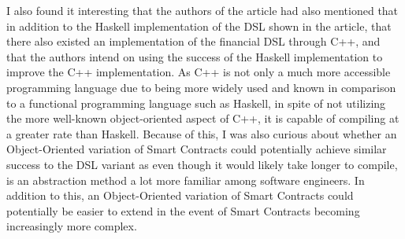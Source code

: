 \documentclass{article}
\theoremstyle{theorem}
\theoremstyle{definition}
\theoremstyle{remark}
\begin{document}
\indent I also found it interesting that the authors of the article had also mentioned that in addition to the Haskell implementation of the DSL shown in the article, that there also existed an implementation of the financial DSL through C++, and that the authors intend on using the success of the Haskell implementation to improve the C++ implementation. As C++ is not only a much more accessible programming language due to being more widely used and known in comparison to a functional programming language such as Haskell, in spite of not utilizing the more well-known object-oriented aspect of C++, it is capable of compiling at a greater rate than Haskell. Because of this, I was also curious about whether an Object-Oriented variation of Smart Contracts could potentially achieve similar success to the DSL variant as even though it would likely take longer to compile, is an abstraction method a lot more familiar among software engineers. In addition to this, an Object-Oriented variation of Smart Contracts could potentially be easier to extend in the event of Smart Contracts becoming increasingly more complex.
\\
\pagebreak
\end{document}
